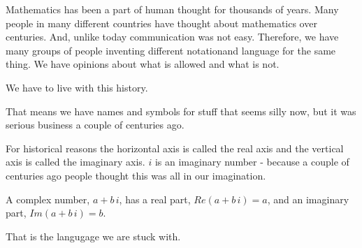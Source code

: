\documentclass{ximera}
\begin{document}
Mathematics has been a part of human thought for thousands of years.  Many people in many different countries have thought about mathematics over centuries.  And, unlike today communication was not easy.  Therefore, we have many groups of people inventing different notationand language for the same thing.  We have opinions about what is allowed and what is not.

We have to live with this history.

That means we have names and symbols for stuff that seems silly now, but it was serious business a couple of centuries ago.

For historical reasons the horizontal axis is called the real axis and the vertical axis is called the imaginary axis.  $i$ is an imaginary number - because a couple of centuries ago people thought this was all in our imagination.


A complex number, $a + b \, i$, has a real part, $Re(a + b \, i)= a$, and an imaginary part, $Im( a + b \, i)= b$.

That is the langugage we are stuck with.
\end{document}
